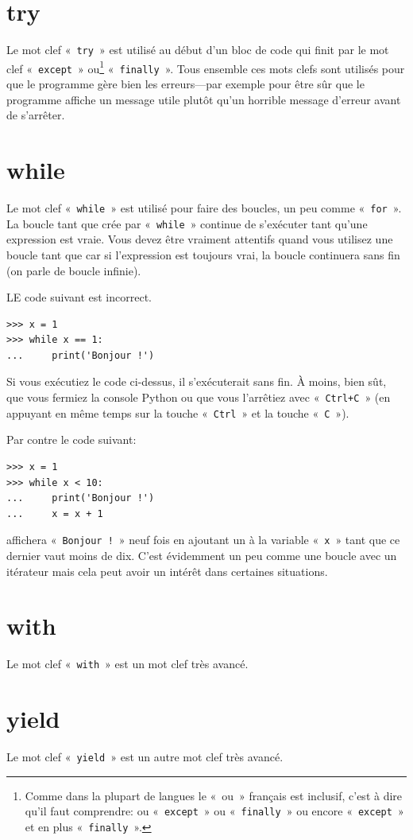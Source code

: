 \section*{try}

Le mot clef «~\texttt{try}~» est utilisé au début d'un bloc de code qui finit par le mot clef «~\texttt{except}~» ou\footnote{Comme dans la plupart de langues le «~ou~» français est inclusif, c'est à dire qu'il faut comprendre: ou «~\texttt{except}~» ou «~\texttt{finally}~» ou encore «~\texttt{except}~» et en plus «~\texttt{finally}~».} «~\texttt{finally}~». Tous ensemble ces mots clefs sont utilisés pour que le programme gère bien les erreurs---par exemple pour être sûr que le programme affiche un message utile plutôt qu'un horrible message d'erreur avant de s'arrêter.

\section*{while}

Le mot clef «~\texttt{while}~» est utilisé pour faire des boucles, un peu comme «~\texttt{for}~». La boucle tant que crée par «~\texttt{while}~» continue de s'exécuter tant qu'une expression est vraie. Vous devez être vraiment attentifs quand vous utilisez une boucle tant que car si l'expression est toujours vrai, la boucle continuera sans fin (on parle de boucle infinie).

LE code suivant est incorrect.
\begin{Verbatim}[frame=single,rulecolor=\color{red},label="ne pas taper"]
>>> x = 1
>>> while x == 1:
...     print('Bonjour !')
\end{Verbatim}

Si vous exécutiez le code ci-dessus, il s'exécuterait sans fin. À moins, bien sût, que vous fermiez la console  Python ou que vous l'arrêtiez avec «~\texttt{Ctrl+C}~» (en appuyant en même temps sur la touche «~\texttt{Ctrl}~» et la touche «~\texttt{C}~»).


Par contre le code suivant:

\begin{Verbatim}[frame=single,rulecolor=\color{gray}]
>>> x = 1
>>> while x < 10:
...     print('Bonjour !')
...     x = x + 1
\end{Verbatim}

affichera «~\texttt{Bonjour !}~» neuf fois en ajoutant un à la variable «~\texttt{x}~» tant que ce dernier vaut moins de dix. C'est évidemment un peu comme une boucle avec un itérateur mais cela peut avoir un intérêt dans certaines situations.

\section*{with}
Le mot clef «~\texttt{with}~» est un mot clef très avancé. 

\section*{yield}
Le mot clef «~\texttt{yield}~» est un autre mot clef très avancé. 

\newpage